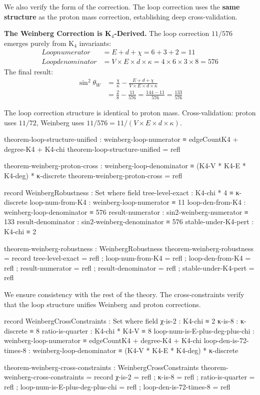 \documentclass[11pt,a4paper]{book}
\def\text#1{#1}%
\begin{document}
We also verify the form of the correction. The loop correction uses the \textbf{same structure} as the proton mass correction, establishing deep cross-validation.

\textbf{The Weinberg Correction is K$_4$-Derived.} The loop correction $11/576$ emerges purely from K$_4$ invariants:
\begin{align*}
\text{Loop numerator} &= E + d + \chi = 6 + 3 + 2 = 11 \\
\text{Loop denominator} &= V \times E \times d \times \kappa = 4 \times 6 \times 3 \times 8 = 576
\end{align*}
The final result:
\begin{align*}
\sin^2\theta_W &= \frac{\chi}{\kappa} - \frac{E + d + \chi}{V \times E \times d \times \kappa} \\
               &= \frac{2}{8} - \frac{11}{576} = \frac{144 - 11}{576} = \frac{133}{576}
\end{align*}

The loop correction structure is identical to proton mass.
Cross-validation: proton uses $11/72$, Weinberg uses $11/576 = 11/(V \times E \times d \times \kappa)$.

\begin{code}
theorem-loop-structure-unified : weinberg-loop-numerator ≡ edgeCountK4 + degree-K4 + K4-chi
theorem-loop-structure-unified = refl

theorem-weinberg-proton-cross : weinberg-loop-denominator ≡ (K4-V * K4-E * K4-deg) * κ-discrete
theorem-weinberg-proton-cross = refl

record WeinbergRobustness : Set where
  field
    tree-level-exact         : K4-chi * 4 ≡ κ-discrete
    loop-num-from-K4         : weinberg-loop-numerator ≡ 11
    loop-den-from-K4         : weinberg-loop-denominator ≡ 576
    result-numerator         : sin2-weinberg-numerator ≡ 133
    result-denominator       : sin2-weinberg-denominator ≡ 576
    stable-under-K4-pert     : K4-chi ≡ 2

theorem-weinberg-robustness : WeinbergRobustness
theorem-weinberg-robustness = record
  { tree-level-exact = refl
  ; loop-num-from-K4 = refl
  ; loop-den-from-K4 = refl
  ; result-numerator = refl
  ; result-denominator = refl
  ; stable-under-K4-pert = refl
  }
\end{code}

We ensure consistency with the rest of the theory. The cross-constraints verify that the loop structure unifies Weinberg and proton corrections.

\begin{code}
record WeinbergCrossConstraints : Set where
  field
    χ-is-2 : K4-chi ≡ 2
    κ-is-8 : κ-discrete ≡ 8
    ratio-is-quarter : K4-chi * K4-V ≡ 8
    loop-num-is-E-plus-deg-plus-chi : weinberg-loop-numerator ≡ edgeCountK4 + degree-K4 + K4-chi
    loop-den-is-72-times-8 : weinberg-loop-denominator ≡ (K4-V * K4-E * K4-deg) * κ-discrete

theorem-weinberg-cross-constraints : WeinbergCrossConstraints
theorem-weinberg-cross-constraints = record
  { χ-is-2 = refl
  ; κ-is-8 = refl
  ; ratio-is-quarter = refl
  ; loop-num-is-E-plus-deg-plus-chi = refl
  ; loop-den-is-72-times-8 = refl
  }
\end{code}
\end{document}
